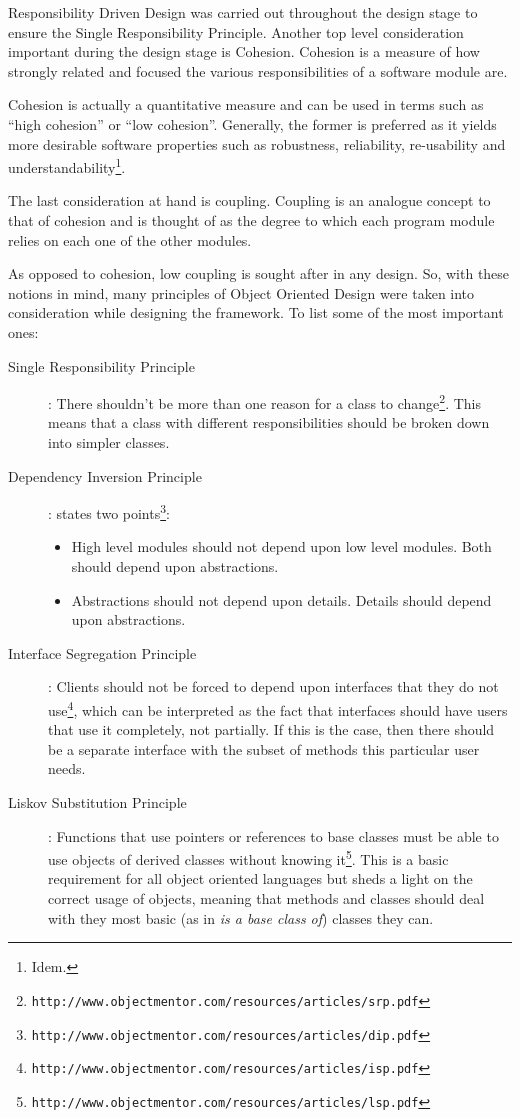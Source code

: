 \documentclass[a4paper,12pt,english]{report}
\begin{document}
Responsibility Driven Design\cite{responsibility} was carried out throughout the design stage to ensure the Single Responsibility Principle. Another top level consideration important during the design stage is Cohesion\cite{design}. Cohesion is a measure of how strongly related and focused the various responsibilities of a software module are. 

Cohesion is actually a quantitative measure and can be used in terms such as ``high cohesion'' or ``low cohesion''. Generally, the former is preferred as it yields more desirable software properties such as robustness, reliability, re-usability and understandability\footnote{Idem.}.

The last consideration at hand is coupling\cite{design}. Coupling is an analogue concept to that of cohesion and is thought of as the degree to which each program module relies on each one of the other modules.

As opposed to cohesion, low coupling is sought after in any design. So, with these notions in mind, many principles of Object Oriented Design were taken into consideration while designing the framework. To list some of the most important ones:

\begin{description}
\item[Single Responsibility Principle]: There shouldn't be more than one reason for a class to change\footnote{\texttt{http://www.objectmentor.com/resources/articles/srp.pdf}}. This means that a class with different responsibilities should be broken down into simpler classes.
\item[Dependency Inversion Principle]: states two points\footnote{\texttt{http://www.objectmentor.com/resources/articles/dip.pdf}}:
\begin{itemize}
 \item High level modules should not depend upon low level modules. Both should depend upon abstractions.
 \item Abstractions should not depend upon details. Details should depend upon abstractions.
\end{itemize}
\item[Interface Segregation Principle]: Clients should not be forced to depend upon interfaces that they do not use\footnote{\texttt{http://www.objectmentor.com/resources/articles/isp.pdf}}, which can be interpreted as the fact that interfaces should have users that use it completely, not partially. If this is the case, then there should be a separate interface with the subset of methods this particular user needs. 
\item[Liskov Substitution Principle]: Functions that use pointers or references to base classes must be able to use objects of derived classes without knowing it\footnote{\texttt{http://www.objectmentor.com/resources/articles/lsp.pdf}}. This is a basic requirement for all object oriented languages but sheds a light on the correct usage of objects, meaning that methods and classes should deal with they most basic (as in \emph{is a base class of}) classes they can. 
\end{description}
\end{document}
